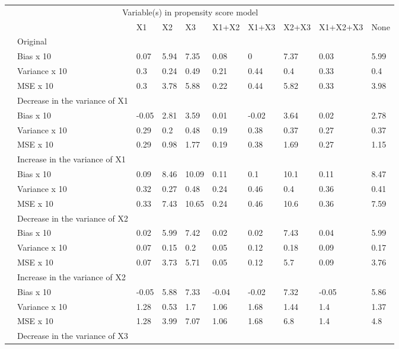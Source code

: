 \documentclass[10,a4paperpaper,]{article}
\begin{document}
\begin{table}[ht]
\centering
\begin{tabular}{rlllllllll}
  \hline
  & \multicolumn{8}{c}{Variable(s) in propensity score model} \\
 & & X1 & X2 & X3 & X1+X2 & X1+X3 & X2+X3 & X1+X2+X3 & None \\
 \hline
 & Original &  &  &  &  &  &  &  &  \\ 
   & Bias x 10 & 0.07 & 5.94 & 7.35 & 0.08 & 0 & 7.37 & 0.03 & 5.99 \\ 
   & Variance x 10 & 0.3 & 0.24 & 0.49 & 0.21 & 0.44 & 0.4 & 0.33 & 0.4 \\ 
   & MSE x 10 & 0.3 & 3.78 & 5.88 & 0.22 & 0.44 & 5.82 & 0.33 & 3.98 \\ 
   & Decrease in the variance of X1 &  &  &  &  &  &  &  &  \\ 
   & Bias x 10 & -0.05 & 2.81 & 3.59 & 0.01 & -0.02 & 3.64 & 0.02 & 2.78 \\ 
   & Variance x 10 & 0.29 & 0.2 & 0.48 & 0.19 & 0.38 & 0.37 & 0.27 & 0.37 \\ 
   & MSE x 10 & 0.29 & 0.98 & 1.77 & 0.19 & 0.38 & 1.69 & 0.27 & 1.15 \\ 
   & Increase in the variance of X1 &  &  &  &  &  &  &  &  \\ 
   & Bias x 10 & 0.09 & 8.46 & 10.09 & 0.11 & 0.1 & 10.1 & 0.11 & 8.47 \\ 
   & Variance x 10 & 0.32 & 0.27 & 0.48 & 0.24 & 0.46 & 0.4 & 0.36 & 0.41 \\ 
   & MSE x 10 & 0.33 & 7.43 & 10.65 & 0.24 & 0.46 & 10.6 & 0.36 & 7.59 \\ 
   & Decrease in the variance of X2 &  &  &  &  &  &  &  &  \\ 
   & Bias x 10 & 0.02 & 5.99 & 7.42 & 0.02 & 0.02 & 7.43 & 0.04 & 5.99 \\ 
   & Variance x 10 & 0.07 & 0.15 & 0.2 & 0.05 & 0.12 & 0.18 & 0.09 & 0.17 \\ 
   & MSE x 10 & 0.07 & 3.73 & 5.71 & 0.05 & 0.12 & 5.7 & 0.09 & 3.76 \\ 
   & Increase in the variance of X2 &  &  &  &  &  &  &  &  \\ 
   & Bias x 10 & -0.05 & 5.88 & 7.33 & -0.04 & -0.02 & 7.32 & -0.05 & 5.86 \\ 
   & Variance x 10 & 1.28 & 0.53 & 1.7 & 1.06 & 1.68 & 1.44 & 1.4 & 1.37 \\ 
   & MSE x 10 & 1.28 & 3.99 & 7.07 & 1.06 & 1.68 & 6.8 & 1.4 & 4.8 \\ 
   & Decrease in the variance of X3 &  &  &  &  &  &  &  &  \\ 

\end{tabular}
\end{table}
\end{document}
